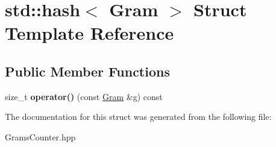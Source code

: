 \hypertarget{structstd_1_1hash_3_01Gram_01_4}{}\section{std\+:\+:hash$<$ Gram $>$ Struct Template Reference}
\label{structstd_1_1hash_3_01Gram_01_4}
\subsection*{Public Member Functions}
\begin{DoxyCompactItemize}
\item 
\mbox{\label{structstd_1_1hash_3_01Gram_01_4_ad947fc278a6bcbee417f5426ca01eaaf}} 
size\+\_\+t {\bfseries operator()} (const \hyperlink{classGram}{Gram} \&g) const
\end{DoxyCompactItemize}


The documentation for this struct was generated from the following file\+:\begin{DoxyCompactItemize}
\item 
Grams\+Counter.\+hpp\end{DoxyCompactItemize}

